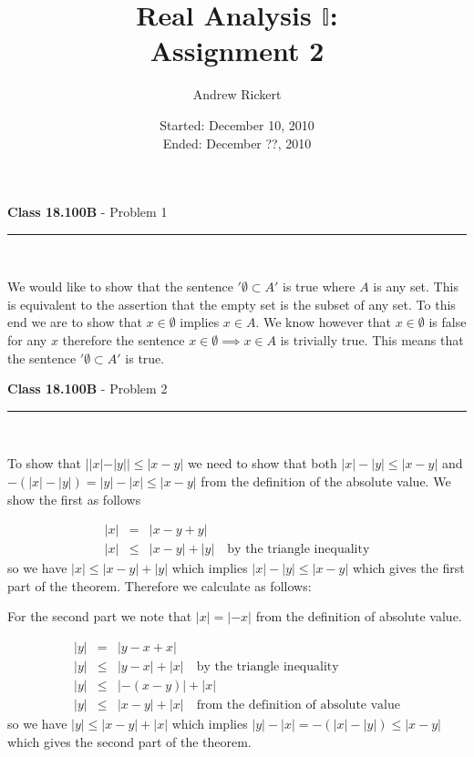 \documentclass[11pt,reqno]{article}
\title{Real Analysis $\mathbb{I}$: \\ Assignment 2}
\author{Andrew Rickert}
\date{Started: December 10, 2010 \\ \hspace{1pt} Ended: December ??, 2010}                                           %
\begin{document}
\maketitle


\begin{flushleft} 
\textbf{Class 18.100B} - Problem 1\\
\rule{500pt}{1pt}\\
\end{flushleft} 

We would like to show that the sentence $'\emptyset \subset A'$ is true where $A$ is any set. This is equivalent to the assertion that the empty set is the subset of any set. To this end we are to show that $x \in \emptyset$ implies $x \in A$. We know however that $x \in \emptyset$ is false for any $x$ therefore the sentence  $x \in \emptyset \implies x \in A$ is trivially true. This means that the sentence  $'\emptyset \subset A'$ is true.


\vspace{15pt}
\begin{flushleft} 
\textbf{Class 18.100B} - Problem 2\\
\rule{500pt}{1pt}\\
\end{flushleft} 

To show that $||x| - |y|| \le |x - y|$ we need to show that both $|x| - |y| \le |x - y|$ and \\$-(|x| - |y|) = |y| - |x| \le |x - y|$ from the definition of the absolute value. We show the first as follows

\begin{eqnarray*}
|x| &=& |x - y + y| \\
|x| &\le& |x - y| + |y| \quad \text{by the triangle inequality}
\end{eqnarray*}
so we have $|x| \le |x - y| + |y|$ which implies $|x| -|y| \le |x - y| $ which gives the first part of the theorem. Therefore we calculate as follows:

For the second part we note that $|x| = |-x|$ from the definition of absolute value.

\begin{eqnarray*}
|y| &=& |y - x + x| \\
|y| &\le& |y - x| + |x| \quad \text{by the triangle inequality} \\
|y| &\le& |-(x - y)| + |x| \\
|y| &\le& |x - y| + |x| \quad \text{from the definition of absolute value}
\end{eqnarray*}
so we have $|y| \le |x - y| + |x|$ which implies $|y| -|x|  = -(|x|-|y|) \le |x - y| $ which gives the second part of the theorem. 
\end{document}
